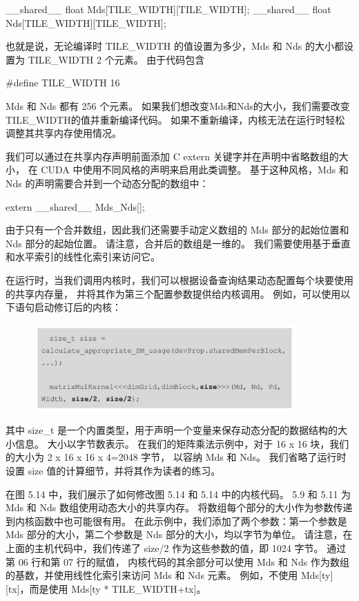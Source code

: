 \_\_shared\_\_ float Mds[TILE\_WIDTH][TILE\_WIDTH];
\_\_shared\_\_ float Nds[TILE\_WIDTH][TILE\_WIDTH];

也就是说，无论编译时 TILE\_WIDTH 的值设置为多少，Mds 和 Nds 的大小都设置为 TILE\_WIDTH 2 个元素。 由于代码包含

\#define TILE\_WIDTH 16

Mds 和 Nds 都有 256 个元素。 如果我们想改变Mds和Nds的大小，我们需要改变TILE\_WIDTH的值并重新编译代码。 
如果不重新编译，内核无法在运行时轻松调整其共享内存使用情况。

我们可以通过在共享内存声明前面添加 C extern 关键字并在声明中省略数组的大小，
在 CUDA 中使用不同风格的声明来启用此类调整。 基于这种风格，Mds 和 Nds 的声明需要合并到一个动态分配的数组中：

extern \_\_shared\_\_ Mds\_Nds[];

由于只有一个合并数组，因此我们还需要手动定义数组的 Mds 部分的起始位置和 Nds 部分的起始位置。 
请注意，合并后的数组是一维的。 我们需要使用基于垂直和水平索引的线性化索引来访问它。

在运行时，当我们调用内核时，我们可以根据设备查询结果动态配置每个块要使用的共享内存量，
并将其作为第三个配置参数提供给内核调用。 例如，可以使用以下语句启动修订后的内核：

\begin{figure}[H]
	\centering
	\includegraphics[width=0.9\textwidth]{figs/F5-a.2.png}
\end{figure}

其中 size\_t 是一个内置类型，用于声明一个变量来保存动态分配的数据结构的大小信息。 
大小以字节数表示。 在我们的矩阵乘法示例中，对于 16 x 16 块，我们的大小为 2 x 16 x 16 x 4=2048 字节，
以容纳 Mds 和 Nds。 我们省略了运行时设置 size 值的计算细节，并将其作为读者的练习。

在图 5.14 中，我们展示了如何修改图 5.14 和 5.14 中的内核代码。 
5.9 和 5.11 为 Mds 和 Nds 数组使用动态大小的共享内存。 将数组每个部分的大小作为参数传递到内核函数中也可能很有用。 
在此示例中，我们添加了两个参数：第一个参数是 Mds 部分的大小，第二个参数是 Nds 部分的大小，均以字节为单位。 
请注意，在上面的主机代码中，我们传递了 size/2 作为这些参数的值，即 1024 字节。 通过第 06 行和第 07 行的赋值，
内核代码的其余部分可以使用 Mds 和 Nds 作为数组的基数，并使用线性化索引来访问 Mds 和 Nds 元素。 
例如，不使用 Mds[ty][tx]，而是使用 Mds[ty * TILE\_WIDTH+tx]。

